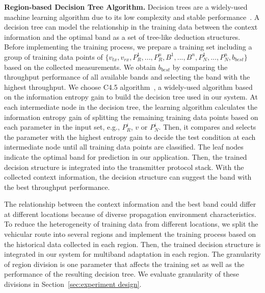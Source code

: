 {\bf Region-based Decision Tree Algorithm.} Decision trees are a  
widely-used machine learning 
algorithm due to its low complexity and stable performance~\cite{banfield2007}.
A decision tree can model the relationship in the training data between the context 
information and the optimal band as a set of tree-like deduction structures. Before 
implementing the training process, we prepare a training set including a group of 
training data points of $\{v_{tx}, v_{rx}, P_R^1, ..., P_R^n,  B^1, ..., B^n, P_N^1, 
..., P_N^n, b_{best}\}$ based on the collected measurements. We obtain $b_{best}$ by comparing
the throughput performance of all available bands and selecting the band with the highest 
throughput. We choose C4.5 algorithm~\cite{hall2009weka}, a widely-used algorithm based on the 
information entropy gain to build the decision tree used in our system. At each intermediate
node in the decision tree, the learning algorithm calculates the information entropy 
gain of splitting the remaining training data points based on each parameter in the input 
set, e.g., $P_R^i$, $v$ or $P_N^i$. Then, it compares and selects the parameter with 
the highest entropy gain to decide the test condition at each intermediate node until 
all training data points are classified. The leaf nodes indicate the optimal band for 
prediction in our application. Then, the trained decision structure is integrated into 
the transmitter protocol stack. With the collected context information, the decision 
structure can suggest the band with the best throughput performance. 

The relationship between the context information and the best band could differ at
different locations because of diverse propagation environment characteristics. 
To reduce the heterogeneity of training data from different locations, we split 
the vehicular route into several regions and implement the training process based 
on the historical data collected in each region. Then, the trained decision structure 
is integrated in our system for multiband adaptation in each region. The granularity 
of region division is one parameter that affects the training set as well as the 
performance of the resulting decision tree. We 
evaluate granularity of these divisions in Section~\ref{sec:experiment design}.
